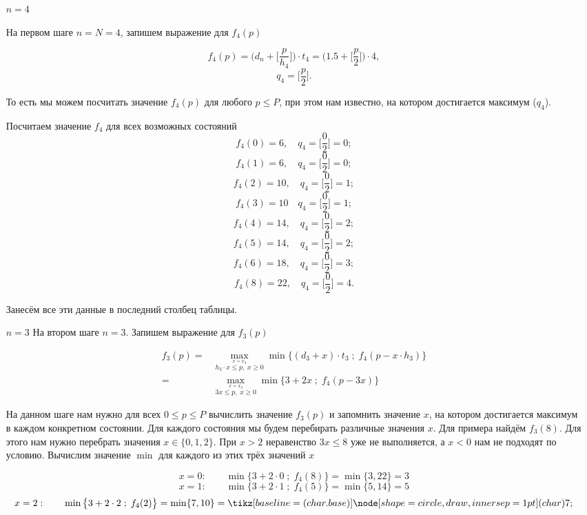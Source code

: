 \begin{enumerate}
	\item[$\boxed{n=4}$]
	
	На первом шаге $n = N = 4$, запишем выражение для $f_4(p)$
	
	\[
		f_4(p) = \bigg(d_n + \bigg[\frac{p}{h_4}\bigg]\bigg) \cdot t_4 = \bigg(1.5 + \bigg[\frac{p}{2}\bigg]\bigg) \cdot 4,
	\]
	\[
		q_4 = \bigg[\frac{p}{2}\bigg].
	\]

	То есть мы можем посчитать значение $f_4(p)$ для любого $p \le P$, при этом нам известно, на котором достигается максимум ($q_4$).

	Посчитаем значение $f_4$ для всех возможных состояний
	\[
		f_4(0) = 6, \quad q_4 = \bigg[\frac{0}{2}\bigg] = 0;
	\]
	\[
		f_4(1) = 6, \quad q_4 = \bigg[\frac{0}{2}\bigg] = 0;
	\]
	\[
		f_4(2) = 10, \quad q_4 = \bigg[\frac{0}{2}\bigg] = 1;
	\]
	\[
		f_4(3) = 10 \quad q_4 = \bigg[\frac{0}{2}\bigg] = 1;
	\]
	\[
		f_4(4) = 14, \quad q_4 = \bigg[\frac{0}{2}\bigg] = 2;
	\]
	\[
		f_4(5) = 14, \quad q_4 = \bigg[\frac{0}{2}\bigg] = 2;
	\]
	\[
		f_4(6) = 18, \quad q_4 = \bigg[\frac{0}{2}\bigg] = 3;
	\]
	\[
		f_4(8) = 22, \quad q_4 = \bigg[\frac{0}{2}\bigg] = 4.
	\]
	
	Занесём все эти данные в последний столбец таблицы.
	
	\item[$\boxed{n=3}$] На втором шаге $n = 3$. Запишем выражение для $f_3(p)$
	
	\begin{align*}
		f_3(p) =& \max_{\stackrel{x = x_3}{h_3 \cdot x \le p, \; x \ge 0}} \min\Big\{(d_3 + x) \cdot t_3 \; ; \; f_{4}(p - x \cdot h_3)\Big\} \\
		=& \max_{\stackrel{x = x_3}{3x \le p, \; x \ge 0}} \min\Big\{3 + 2x \; ; \; f_{4}(p - 3x)\Big\}
	\end{align*}
	
	На данном шаге нам нужно для всех $0 \le p \le P$ вычислить значение $f_3(p)$ и запомнить значение $x$, на котором достигается максимум в каждом конкретном состоянии. Для каждого состояния мы будем перебирать различные значения $x$. Для примера найдём $f_3(8)$. Для этого нам нужно перебрать значения $x \in \{0, 1, 2\}$. При $x > 2$ неравенство $3x \le 8$ уже не выполняется, а $x < 0$ нам не подходят по условию. Вычислим значение $\min$ для каждого из этих трёх значений $x$
	
	\[
		x = 0: \qquad \min\big\{3 + 2 \cdot 0 \; ; \; f_4(8)\big\} = \min\{3, 22\} = 3
	\]
	\[
		x = 1: \qquad \min\big\{3 + 2 \cdot 1 \; ; \; f_4(5)\big\} = \min\{5, 14\} = 5
	\]
	\[
		x = 2: \qquad \min\big\{3 + 2 \cdot 2 \; ; \; f_4(2)\big\} = \min\{7, 10\} = \circled{7}
	\]
	

\end{enumerate}
